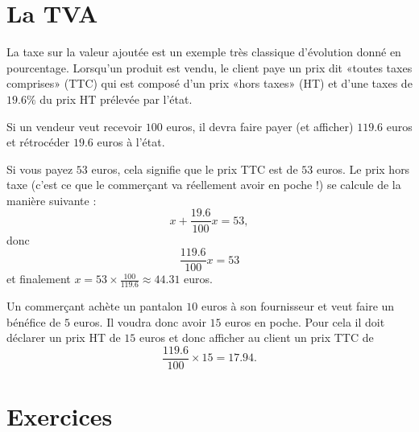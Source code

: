 \section{La TVA}

La taxe sur la valeur ajoutée est un exemple très classique d'évolution donné en pourcentage. Lorsqu'un produit est vendu, le client paye un prix dit «toutes taxes comprises» (TTC) qui est composé d'un prix «hors taxes» (HT) et d'une taxes de \( 19.6\%\) du prix HT prélevée par l'état.

\begin{example}
    Si un vendeur veut recevoir \( 100\) euros, il devra faire payer (et afficher) \( 119.6\) euros et rétrocéder \( 19.6\) euros à l'état.
\end{example}

\begin{example}
    Si vous payez \( 53\) euros, cela signifie que le prix TTC est de \( 53\) euros. Le prix hors taxe (c'est ce que le commerçant va réellement avoir en poche !) se calcule de la manière suivante :
    \begin{equation}
        x+\frac{ 19.6 }{ 100 }x=53,
    \end{equation}
    donc
    \begin{equation}
        \frac{ 119.6 }{ 100 }x=53
    \end{equation}
    et finalement \( x=53\times\frac{ 100 }{ 119.6 }\approx 44.31\) euros.
\end{example}

\begin{example}
    Un commerçant achète un pantalon \( 10\) euros à son fournisseur et veut faire un bénéfice de \( 5\) euros. Il voudra donc avoir \( 15\) euros en poche. Pour cela il doit déclarer un prix HT de \( 15\) euros et donc afficher au client un prix TTC de
    \begin{equation}
        \frac{ 119.6 }{ 100 }\times 15=17.94.
    \end{equation}
\end{example}

\section{Exercices}


